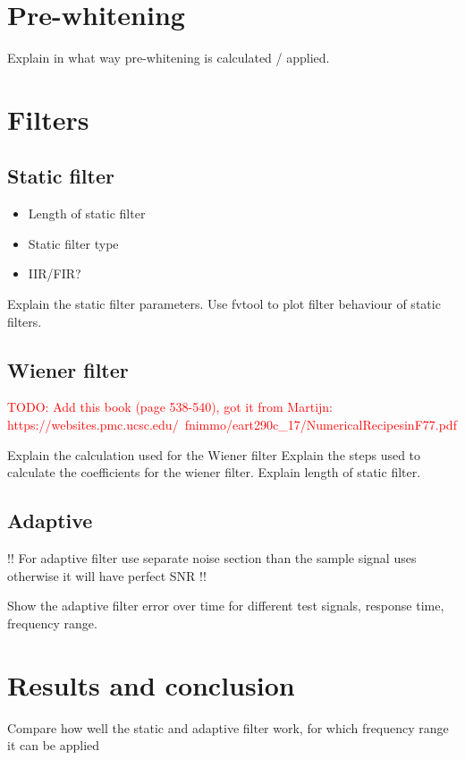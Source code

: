 \section{Pre-whitening}
Explain in what way pre-whitening is calculated / applied.
\section{Filters}
\subsection{Static filter}

\begin{itemize}
    \item Length of static filter
    \item Static filter type
    \item IIR/FIR? 
\end{itemize}

Explain the static filter parameters. Use fvtool to plot filter behaviour of static filters.

\subsection{Wiener filter}

\textcolor{red}{TODO: Add this book (page 538-540), got it from Martijn: https://websites.pmc.ucsc.edu/~fnimmo/eart290c_17/NumericalRecipesinF77.pdf}



Explain the calculation used for the Wiener filter
Explain the steps used to calculate the coefficients for the wiener filter. Explain length of static filter. 
\subsection{Adaptive}

!! For adaptive filter use separate noise section than the sample signal uses otherwise it will have perfect SNR !!

Show the adaptive filter error over time for different test signals, response time, frequency range.

\section{Results and conclusion}

Compare how well the static and adaptive filter work, for which frequency range it can be applied


